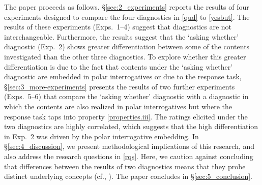 \documentclass[times,linguex]{glossa}
\begin{document}


The paper proceeds as follows. \S\ref{sec:2_experiments} reports the results of four experiments designed to compare the four diagnostics in \ref{qud} to \ref{yesbut}. The results of these experiments (Exps.~1--4) suggest that diagnostics are not interchangeable. Furthermore, the results suggest that the `asking whether' diagnostic (Exp.~2) shows greater differentiation between some of the contents investigated than the other three diagnostics. To explore whether this greater differentiation is due to the fact that contents under the `asking whether' diagnostic are embedded in polar interrogatives or due to the response task, \S\ref{sec:3_more-experiments} presents the results of two further experiments (Exps.~5--6) that compare the `asking whether' diagnostic with a diagnostic in which the contents are also realized in polar interrogatives but where the response task taps into property \ref{properties.iii}. The ratings elicited under the two diagnostics are highly correlated, which suggests that the high differentiation in Exp.~2 was driven by the polar interrogative embedding. In \S\ref{sec:4_discussion}, we present methodological implications of this research, and also address the research questions in \ref{rqs}.  Here, we caution against concluding that differences between the results of two diagnostics means that they probe distinct underlying concepts (cf., \citealt{snider_anaphoric_2017,koev_notions_2018}). The paper concludes in \S\ref{sec:5_conclusion}. 
\end{document}
